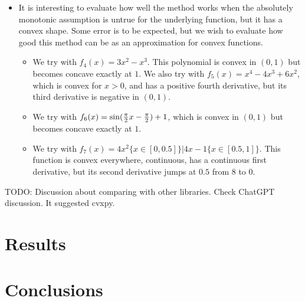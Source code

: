 \documentclass[12pt,a4paper]{article}
\begin{document}
\begin{itemize}
\begin{itemize}
\item {} It is interesting to evaluate how well the method works when the absolutely monotonic assumption is untrue for the underlying function, but it has a convex shape. Some error is to be expected, but we wish to evaluate how good this method can be as an approximation for convex functions.
\begin{itemize}
\item {} We try with $f_4(x) = 3 x^2 - x^3$. This polynomial is convex in $(0,1)$ but becomes concave exactly at $1$. We also try with $f_5(x) = x^4 - 4x^3 + 6x^2$, which is convex for $x > 0$, and has a positive fourth derivative, but its third derivative is negative in $(0,1)$.
\item {} We try with $f_6(x) = \sin({{\pi} \over {2}} x - {{\pi} \over {2}}) + 1$, which is convex in $(0,1)$ but becomes concave exactly at $1$.
\item {} We try with $f_7(x) = 4x^2 \{x \in [0,0.5]\} | 4x - 1 \{x \in [0.5,1]\}$. This function is convex everywhere, continuous, has a continuous first derivative, but its second derivative jumps at $0.5$ from $8$ to $0$.
\end{itemize}

\end{itemize}
\end{itemize}

TODO: Discussion about comparing with other libraries. Check ChatGPT discussion. It suggested cvxpy.

\section{Results}

\section{Conclusions}

\dobibliography
\end{document}
